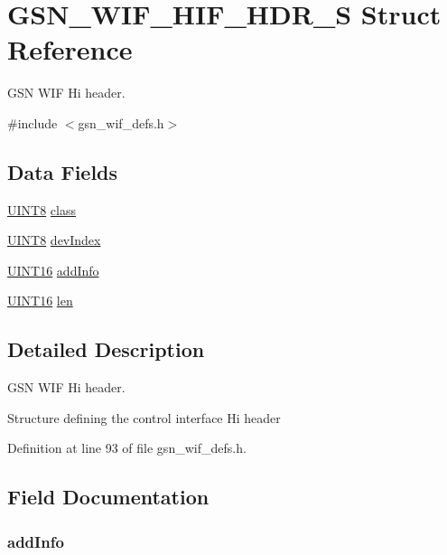 \hypertarget{a00337}{
\section{GSN\_\-WIF\_\-HIF\_\-HDR\_\-S Struct Reference}
\label{a00337}
}


GSN WIF Hi header.  




{\ttfamily \#include $<$gsn\_\-wif\_\-defs.h$>$}

\subsection*{Data Fields}
\begin{DoxyCompactItemize}
\item 
\hyperlink{a00660_gab27e9918b538ce9d8ca692479b375b6a}{UINT8} \hyperlink{a00337_ab2aaa57d5f0775790d105e3fc94ec8a1}{class}
\item 
\hyperlink{a00660_gab27e9918b538ce9d8ca692479b375b6a}{UINT8} \hyperlink{a00337_ae6b8b33d80e4df49b18e199b0046750c}{devIndex}
\item 
\hyperlink{a00660_ga09f1a1fb2293e33483cc8d44aefb1eb1}{UINT16} \hyperlink{a00337_a39af37fe3947efc932338fa9e665954a}{addInfo}
\item 
\hyperlink{a00660_ga09f1a1fb2293e33483cc8d44aefb1eb1}{UINT16} \hyperlink{a00337_ab3bcead9c261261394a5d9b3bf8f95cb}{len}
\end{DoxyCompactItemize}


\subsection{Detailed Description}
GSN WIF Hi header. 

Structure defining the control interface Hi header 

Definition at line 93 of file gsn\_\-wif\_\-defs.h.



\subsection{Field Documentation}
\hypertarget{a00337_a39af37fe3947efc932338fa9e665954a}{
\subsubsection[{addInfo}]{ {\bf addInfo}}}
\label{a00337_a39af37fe3947efc932338fa9e665954a}



